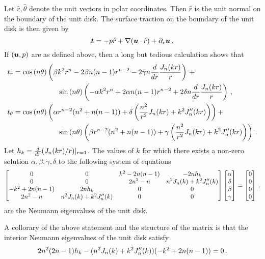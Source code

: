 Let $\hat{r}, \hat{\theta}$ denote the unit vectors in polar coordinates.
Then  $\hat{r}$ is the unit normal on the boundary of the unit disk.
The surface traction on the boundary of the unit disk is then given by 
\begin{equation}
{\boldsymbol t} = -p \hat{r} + \nabla ({\boldsymbol u} \cdot \hat{r}) + \partial_{r} {\boldsymbol u} \, .
\end{equation}
If $({\boldsymbol u},p)$ are as defined above, then 
a long but tedious calculation shows that
\begin{equation}
\begin{aligned}
t_{r} &= \cost \left( \beta k^2 r^{n} -2\beta n(n-1)r^{n-2} - 2\gamma n \ddr \frac{\jnkr}{r}  \right) \, + \\
& \hspace*{15ex} \sint \left(-\alpha k^2 r^{n} + 2 \alpha n(n-1)r^{n-2} + 2 \delta n \ddr \frac{\jnkr}{r} \right) \, , \\
t_{\theta} &= \cost \left( \alpha r^{n-2} (n^2 + n(n-1)) + \delta \left( \frac{n^2}{r^2} \jnkr + k^2 \jnppkr \right)  \right) + \\
& \hspace*{15ex} \sint \left( \beta r^{n-2} (n^2 + n(n-1)) + \gamma \left( \frac{n^2}{r^2} \jnkr + k^2 \jnppkr \right) \right) \, .
\end{aligned}
\end{equation}
Let $h_{k} = \frac{d}{dr} (J_{n}(kr)/r)|_{r=1}$.
The values of $k$ for which there exists a non-zero solution $\alpha,\beta,\gamma,\delta$ 
to the following system of equations
\begin{equation}
\begin{bmatrix}
0 & 0 & k^2 - 2n(n-1) & -2nh_{k} \\
0 & 0 & 2n^2 -n & n^2 J_{n}(k) + k^2 J_{n}''(k) \\
-k^2 + 2n(n-1) & 2nh_{k} & 0 & 0 \\
2n^2 -n & n^2 J_{n}(k) + k^2 J_{n}''(k) & 0 & 0
\end{bmatrix}
\begin{bmatrix}
\alpha \\ \delta \\ \beta \\ \gamma
\end{bmatrix}
=
\begin{bmatrix}
0 \\ 0 \\ 0 \\ 0
\end{bmatrix}
\, ,
\end{equation}
are the Neumann eigenvalues of the unit disk.

A collorary of the above statement and the structure of the matrix is that
the interior Neumann eigenvalues of the unit disk satisfy
\begin{equation}
2n^2(2n-1)h_{k} - (n^2 J_{n}(k) + k^2 J_{n}''(k))(-k^2 + 2n(n-1)) = 0 \, .
\end{equation}
